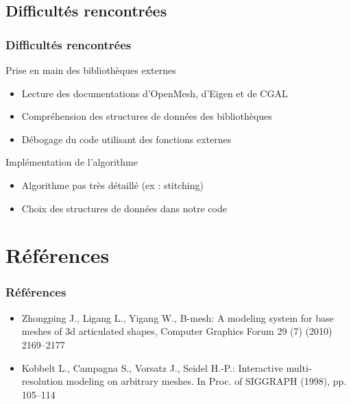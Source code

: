 \documentclass[9pt]{beamer}
\begin{document}
\subsection{Difficultés rencontrées}

\begin{frame}
	\frametitle{Difficultés rencontrées}
	
	\begin{block} { Prise en main des bibliothèques externes }
		\begin{itemize}
			\item Lecture des documentations d'OpenMesh, d'Eigen et de CGAL
			\item Compréhension des structures de données des bibliothèques
			\item Débogage du code utilisant des fonctions externes
		\end{itemize}
	\end{block}
	
	\begin{block}{ Implémentation de l'algorithme }
		\begin{itemize}
			\item Algorithme pas très détaillé (ex : stitching)
			\item Choix des structures de données dans notre code
		\end{itemize}
	\end{block}
\end{frame}

\section{Références}
\begin{frame}
	\frametitle{Références}
	\begin{itemize}
		\item  Zhongping J., Ligang L., Yigang W., B-mesh: A modeling system for base meshes of 3d articulated shapes, Computer 					Graphics Forum 29 (7) (2010) 2169–2177
		\item Kobbelt L., Campagna S., Vorsatz J., Seidel H.-P.: Interactive multi-resolution modeling on arbitrary meshes. In Proc. of SIGGRAPH (1998), pp. 105–114
	\end{itemize}
\end{frame}

\end{document}
